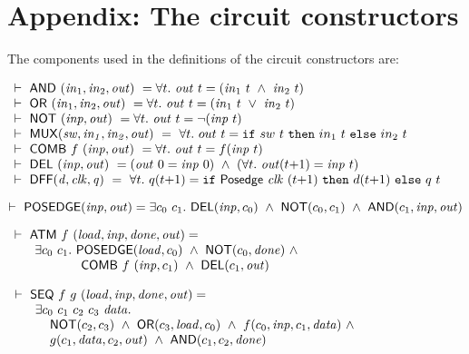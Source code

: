 \newpage
\section*{Appendix: The circuit constructors}
\label{CircuitConstructors}
\vspace*{-3mm}

The components used in the definitions of the circuit constructors are:

\smallskip
$
\begin{array}{l}
\TURNST\ \DEF{AND}\ (\sVAR{in}{1},\sVAR{in}{2},\VAR{out}) ~ = 
   \forall t.\ \VAR{out}\ t = (\sVAR{in}{1}\ t\ \AND\ \sVAR{in}{2}\ t)\\
\TURNST\ \DEF{OR}\ (\sVAR{in}{1},\sVAR{in}{2},\VAR{out}) ~ =
   \forall t.\ \VAR{out}\ t = (\sVAR{in}{1}\ t\ \OR\ \sVAR{in}{2}\ t)\\
\TURNST\ \DEF{NOT}\ (\VAR{inp},\VAR{out}) ~ = 
   \forall t.\ \VAR{out}\ t = \NOT(\VAR{inp}\ t)\\
\TURNST\ \DEF{MUX} (\VAR{sw,in_1,in_2,out})~ =~
 \forall t.\ out~t =  \IF{sw~t}{in_1~t}{in_2~t}\\
\TURNST\ \DEF{COMB}\ f\ \VAR{(inp,out)} ~ = \forall t.\ \VAR{out}\ t = f (\VAR{inp}\ t)\\
\TURNST\ \DEF{DEL}\ (\VAR{inp},\VAR{out}) ~ = 
    (\VAR{out}\ 0 = \VAR{inp}\ 0)\ \AND\ 
    (\forall t.\ \VAR{out} (t{+}1) = \VAR{inp}\ t)\\
\TURNST\ \DEF{DFF} (\VAR{d,clk,q})~ =~
 \forall t.\ q (t{+}1) =  \IF{\DEF{Posedge}\ \VAR{clk}\ (t{+}1)}{d (t{+}1)}{q\ t}
\end{array}
$
 

$
\vdash\ \mathsf{POSEDGE} (\mathit{inp},\mathit{out}) = 
    \exists c_0~ c_1.\ \mathsf{DEL} (\mathit{inp},c_0)\ \wedge\
                  \mathsf{NOT} (c_0, c_1)\ \wedge\ \mathsf{AND} (c_1,\mathit{inp},\mathit{out})
$

$
\begin{array}{l}
\TURNST\ \DEF{ATM}\ f\ (\VAR{load,inp,done,out}) =\\
\phantom{\TURNST\ ~~}    \exists c_0~ c_1.\ \DEF{POSEDGE} (\VAR{load}, c_0)\ \AND \ 
\DEF{NOT} (c_0, \VAR{done})\ \AND\\
\phantom{\TURNST\ ~~\exists c_0, c_1.\ }  \DEF{COMB}\ f\ (\VAR{inp},c_1)\ \AND\ \DEF{DEL} (c_1,\VAR{out})
\end{array}
$


$
\begin{array}{l}
\TURNST\ \DEF{SEQ}\ f\ g\ (\VAR{load,inp,done,out}) = \\
\phantom{\TURNST\ ~~} \exists c_0~ c_1~ c_2~ c_3~ \VAR{data}.\\
\phantom{\TURNST\ ~~\exists~}                      \DEF{NOT} (c_2,c_3) \ \AND \ 
                      \DEF{OR} (c_3,\VAR{load},c_0) \ \AND \  f (c_0,\VAR{inp},c_1,\VAR{data}) \ \AND \\
\phantom{\TURNST\ ~~ \exists~} 
        g (c_1,\VAR{data},c_2,\VAR{out})\ \AND\ 
        \DEF{AND} (c_1,c_2,\VAR{done}) 
\end{array}
$

